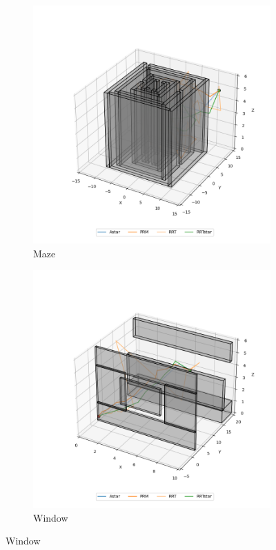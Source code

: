 \documentclass[conference]{IEEEtran}
\begin{document}
\begin{figure}[htbp]
\begin{subfigure}[b]{0.3\textwidth}
        \includegraphics[width=\textwidth]{img/maze.png}
        \caption{Maze}
    \end{subfigure}
    \hfill
    \begin{subfigure}[b]{0.3\textwidth}
        \centering
        \includegraphics[width=\textwidth]{img/window.png}
        \caption{Window}
    \end{subfigure}


\end{figure}
\end{document}
